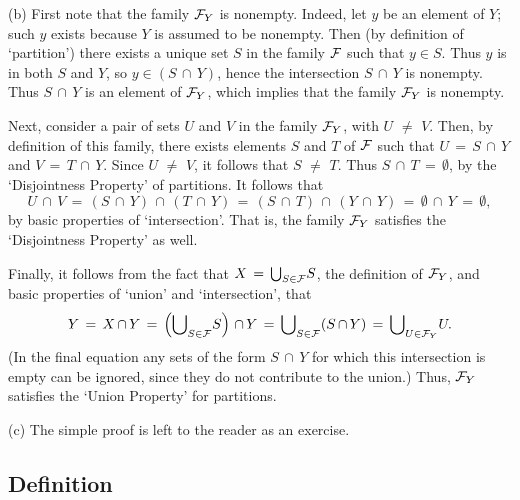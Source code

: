 \V

        (b) First note that the family ${\cal F}_{Y}$ is nonempty.
    Indeed, let $y$ be an element of $Y$; such $y$ exists because $Y$ is assumed to be nonempty.
    Then (by definition of `partition') there exists a unique set $S$ in the family ${\cal F}$ such that $y{\in}S$.
    Thus $y$ is in both $S$ and $Y$, so $y{\in}(S\,{\cap}\,Y)$, hence the intersection $S\,{\cap}\,Y$ is nonempty.
    Thus $S\,{\cap}\,Y$ is an element of ${\cal F}_{Y}$, which implies that the family ${\cal F}_{Y}$ is nonempty.

        Next, consider a pair of sets $U$ and $V$ in the family ${\cal F}_{Y}$, with $U \,\,{\neq}\,\, V$.
    Then, by definition of this family, there exists elements $S$ and $T$ of ${\cal F}$ such that $U \,=\, S\,{\cap}\,Y$ and $V \,=\, T\,{\cap}\,Y$.
    Since $U\,\,{\neq}\,\, V$, it follows that $S \,\,{\neq}\,\, T$.
    Thus $S\,{\cap}\,T \,=\, {\emptyset}$, by the `Disjointness Property' of partitions.
    It follows that
        \begin{displaymath}
        U\,{\cap}\,V \,=\, (S\,{\cap}\,Y)\,{\cap}\,(T\,{\cap}\,Y) \,=\, (S\,{\cap}\,T)\,{\cap}\,(Y\,{\cap}\,Y) \,=\, {\emptyset}\,{\cap}\,Y \,=\, {\emptyset},
        \end{displaymath}
    by basic properties of `intersection'.
    That is, the family ${\cal F}_{Y}$ satisfies the `Disjointness Property' as well.

        Finally, it follows from the fact that $X \,=\, {\bigcup}_{S{\in}{\cal F}} S$, the definition of ${\cal F}_{Y}$,
    and basic properties of `union' and `intersection', that
        \begin{displaymath}
        Y \,=\, X\,{\cap}\,Y \,=\, \left({\bigcup}_{S{\in}{\cal F}} S\right)\,{\cap}\,Y \,=\, {\bigcup}_{S{\in}{\cal F}} (S\,{\cap}\,Y) \,=\, 
    {\bigcup}_{U{\in}{\cal F}_{Y}} U.
        \end{displaymath}
    (In the final equation any sets of the form $S\,{\cap}\,Y$ for which this intersection is empty can be ignored, since they do not contribute to the union.)
    Thus, ${\cal F}_{Y}$ satisfies the `Union Property' for partitions.

\V

        (c) The simple proof is left to the reader as an exercise.


\V
\V

        \subsection{\small{{\bf Definition}}}
                \label{DefA50.117}

